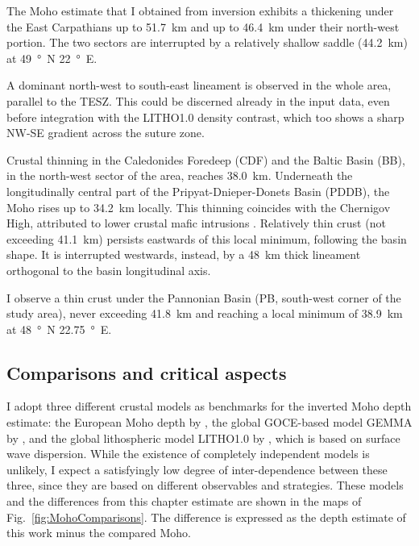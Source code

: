 The Moho estimate that I obtained from inversion exhibits a thickening under the East Carpathians up to 51.7~\si{\kilo \metre} and up to \SI{46.4}{\kilo \metre} under their north-west portion.
The two sectors are interrupted by a relatively shallow saddle (\SI{44.2}{\kilo \metre}) at \SI{49}{\degree N} \SI{22}{\degree E}.

A dominant north-west to south-east lineament is observed in the whole area, parallel to the TESZ.
This could be discerned already in the input data, even before integration with the {LITHO1.0} density contrast, which too shows a sharp NW-SE gradient across the suture zone.

Crustal thinning  in the Caledonides Foredeep (CDF) and the Baltic Basin (BB), in the north-west sector of the area, reaches \SI{38.0}{\kilo \metre}.
Underneath the longitudinally central part of the Pripyat-Dnieper-Donets Basin (PDDB), the Moho rises up to 34.2~\si{\kilo \metre} locally. This thinning coincides with the Chernigov High, attributed to lower crustal mafic intrusions \parencite{Starostenko2018}.
Relatively thin crust (not exceeding \SI{41.1}{\kilo \metre}) persists eastwards of this local minimum, following the basin shape.
It is interrupted westwards, instead, by a \SI{48}{\kilo \metre} thick lineament orthogonal to the basin longitudinal axis.

I observe a thin crust under the Pannonian Basin (PB, south-west corner of the study area), never exceeding \SI{41.8}{\kilo \metre} and reaching a local minimum of \SI{38.9}{\kilo \metre} at \SI{48}{\degree N} \SI{22.75}{\degree E}.

\subsection{Comparisons and critical aspects}
\label{ss:Appl:DiscGravComp}

I adopt three different crustal models as benchmarks for the inverted Moho depth estimate: the European Moho depth by \textcite{Grad2009}, the global GOCE-based model GEMMA by \textcite{Reguzzoni2015}, and the global lithospheric model {LITHO1.0} by \textcite{Pasyanos2014}, which is based on surface wave dispersion.
While the existence of completely independent models is unlikely, I expect a satisfyingly low degree of inter-dependence between these three, since they are based on different observables and strategies.
These models and the differences from this chapter estimate are shown in the maps of Fig.~\ref{fig:MohoComparisons}.
The difference is expressed as the depth estimate of this work minus the compared Moho.

